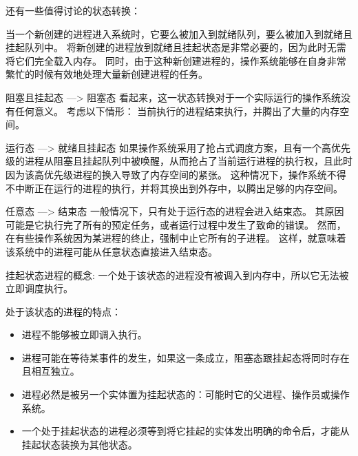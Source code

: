 {{{{                还有一些值得讨论的状态转换：

                \begin{description}
                    \item[新创建态 ---> 就绪且挂起态及新创建态 ---> 就绪态]
                    {
                        当一个新创建的进程进入系统时，它要么被加入到就绪队列，要么被加入到就绪且挂起队列中。
                        将新创建的进程放到就绪且挂起状态是非常必要的，因为此时无需将它们完全载入内存。
                        同时，由于这种新创建进程的，操作系统能够在自身非常繁忙的时候有效地处理大量新创建进程的任务。
                    }
                    \item{阻塞且挂起态 ---> 阻塞态}
                    {
                        看起来，这一状态转换对于一个实际运行的操作系统没有任何意义。
                        考虑以下情形：
                        当前执行的进程结束执行，并腾出了大量的内存空间。
                    }
                    \item{运行态 ---> 就绪且挂起态}
                    {
                        如果操作系统采用了抢占式调度方案，且有一个高优先级的进程从阻塞且挂起队列中被唤醒，从而抢占了当前运行进程的执行权，且此时因为该高优先级进程的换入导致了内存空间的紧张。
                        这种情况下，操作系统不得不中断正在运行的进程的执行，并将其换出到外存中，以腾出足够的内存空间。
                    }
                    \item{任意态 ---> 结束态}
                    {
                        一般情况下，只有处于运行态的进程会进入结束态。
                        其原因可能是它执行完了所有的预定任务，或者运行过程中发生了致命的错误。
                        然而，在有些操作系统因为某进程的终止，强制中止它所有的子进程。
                        这样，就意味着该系统中的进程可能从任意状态直接进入结束态。
                    }
                \end{description}
            }

            {
                挂起状态进程的概念:
                一个处于该状态的进程没有被调入到内存中，所以它无法被立即调度执行。

                处于该状态的进程的特点：

                \begin{itemize}
                    \item 进程不能够被立即调入执行。
                    \item 进程可能在等待某事件的发生，如果这一条成立，阻塞态跟挂起态将同时存在且相互独立。
                    \item 进程必然是被另一个实体置为挂起状态的：可能时它的父进程、操作员或操作系统。
                    \item 一个处于挂起状态的进程必须等到将它挂起的实体发出明确的命令后，才能从挂起状态装换为其他状态。
                \end{itemize}

}}}}
